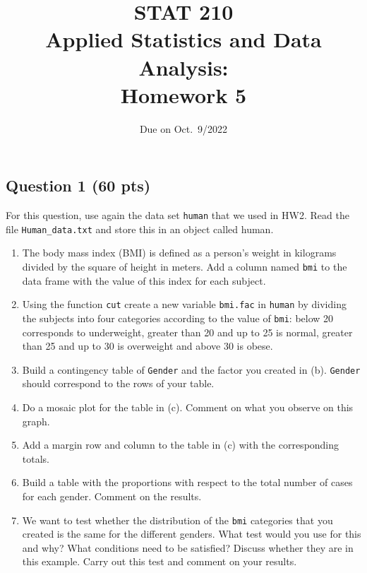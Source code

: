 \documentclass[
]{article}
\title{STAT 210\\
Applied Statistics and Data Analysis:\\
Homework 5}
\author{}
\date{\vspace{-2.5em}Due on Oct.~9/2022}
\begin{document}
\maketitle

\hypertarget{question-1-60-pts}{%
\subsection{Question 1 (60 pts)}\label{question-1-60-pts}}

For this question, use again the data set \texttt{human} that we used in
HW2. Read the file \texttt{Human\_data.txt} and store this in an object
called human.

\begin{enumerate}
\def\labelenumi{(\alph{enumi})}
\item
  The body mass index (BMI) is defined as a person's weight in kilograms
  divided by the square of height in meters. Add a column named
  \texttt{bmi} to the data frame with the value of this index for each
  subject.
\item
  Using the function \texttt{cut} create a new variable \texttt{bmi.fac}
  in \texttt{human} by dividing the subjects into four categories
  according to the value of \texttt{bmi}: below 20 corresponds to
  underweight, greater than 20 and up to 25 is normal, greater than 25
  and up to 30 is overweight and above 30 is obese.
\item
  Build a contingency table of \texttt{Gender} and the factor you
  created in (b). \texttt{Gender} should correspond to the rows of your
  table.
\item
  Do a mosaic plot for the table in (c). Comment on what you observe on
  this graph.
\item
  Add a margin row and column to the table in (c) with the corresponding
  totals.
\item
  Build a table with the proportions with respect to the total number of
  cases for each gender. Comment on the results.
\item
  We want to test whether the distribution of the \texttt{bmi}
  categories that you created is the same for the different genders.
  What test would you use for this and why? What conditions need to be
  satisfied? Discuss whether they are in this example. Carry out this
  test and comment on your results.
\end{enumerate}
\end{document}
